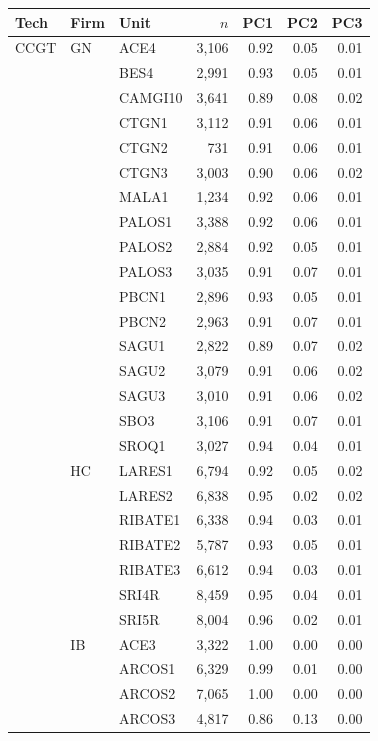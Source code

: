 \begin{tabular}{l l l r r r r}
\toprule
Tech & Firm & Unit & $n$ & PC1 & PC2 & PC3 \\
\midrule
CCGT & GN & ACE4 & 3,106 & 0.92 & 0.05 & 0.01 \\
 &  & BES4 & 2,991 & 0.93 & 0.05 & 0.01 \\
 &  & CAMGI10 & 3,641 & 0.89 & 0.08 & 0.02 \\
 &  & CTGN1 & 3,112 & 0.91 & 0.06 & 0.01 \\
 &  & CTGN2 & 731 & 0.91 & 0.06 & 0.01 \\
 &  & CTGN3 & 3,003 & 0.90 & 0.06 & 0.02 \\
 &  & MALA1 & 1,234 & 0.92 & 0.06 & 0.01 \\
 &  & PALOS1 & 3,388 & 0.92 & 0.06 & 0.01 \\
 &  & PALOS2 & 2,884 & 0.92 & 0.05 & 0.01 \\
 &  & PALOS3 & 3,035 & 0.91 & 0.07 & 0.01 \\
 &  & PBCN1 & 2,896 & 0.93 & 0.05 & 0.01 \\
 &  & PBCN2 & 2,963 & 0.91 & 0.07 & 0.01 \\
 &  & SAGU1 & 2,822 & 0.89 & 0.07 & 0.02 \\
 &  & SAGU2 & 3,079 & 0.91 & 0.06 & 0.02 \\
 &  & SAGU3 & 3,010 & 0.91 & 0.06 & 0.02 \\
 &  & SBO3 & 3,106 & 0.91 & 0.07 & 0.01 \\
 &  & SROQ1 & 3,027 & 0.94 & 0.04 & 0.01 \\
 & HC & LARES1 & 6,794 & 0.92 & 0.05 & 0.02 \\
 &  & LARES2 & 6,838 & 0.95 & 0.02 & 0.02 \\
 &  & RIBATE1 & 6,338 & 0.94 & 0.03 & 0.01 \\
 &  & RIBATE2 & 5,787 & 0.93 & 0.05 & 0.01 \\
 &  & RIBATE3 & 6,612 & 0.94 & 0.03 & 0.01 \\
 &  & SRI4R & 8,459 & 0.95 & 0.04 & 0.01 \\
 &  & SRI5R & 8,004 & 0.96 & 0.02 & 0.01 \\
 & IB & ACE3 & 3,322 & 1.00 & 0.00 & 0.00 \\
 &  & ARCOS1 & 6,329 & 0.99 & 0.01 & 0.00 \\
 &  & ARCOS2 & 7,065 & 1.00 & 0.00 & 0.00 \\
 &  & ARCOS3 & 4,817 & 0.86 & 0.13 & 0.00 \\

\end{tabular}
